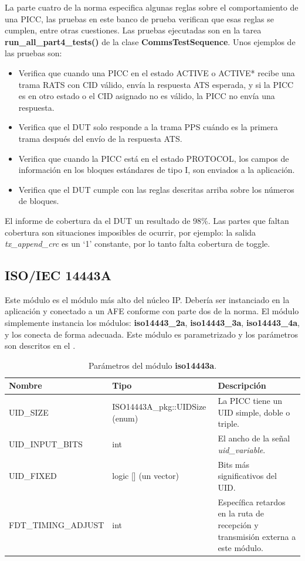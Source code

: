 \documentclass[a4paper, twoside, 11pt]{report}
\begin{document}
La parte cuatro de la norma especifica algunas reglas sobre el comportamiento de una PICC, las pruebas en este banco de prueba verifican que esas reglas se cumplen, entre otras cuestiones. Las pruebas ejecutadas son en la tarea \textbf{run\_all\_part4\_tests()} de la clase \textbf{CommsTestSequence}. Unos ejemplos de las pruebas son:

\begin{itemize}
  \item Verifica que cuando una PICC en el estado ACTIVE o ACTIVE* recibe una trama RATS con CID válido, envía la respuesta ATS esperada, y si la PICC es en otro estado o el CID asignado no es válido, la PICC no envía una respuesta.
  \item Verifica que el DUT solo responde a la trama PPS cuándo es la primera trama después del envío de la respuesta ATS.
  \item Verifica que cuando la PICC está en el estado PROTOCOL, los campos de información en los bloques estándares de tipo I, son enviados a la aplicación.
  \item Verifica que el DUT cumple con las reglas descritas arriba sobre los números de bloques.
\end{itemize}

El informe de cobertura da el DUT un resultado de 98\%. Las partes que faltan cobertura son situaciones imposibles de ocurrir, por ejemplo: la salida \textit{tx\_append\_crc} es un ‘1’ constante, por lo tanto falta cobertura de toggle.

\FloatBarrier
\subsection{ISO/IEC 14443A}

Este módulo es el módulo más alto del núcleo IP. Debería ser instanciado en la aplicación y conectado a un AFE conforme con parte dos de la norma. El módulo simplemente instancia los módulos: \textbf{iso14443\_2a}, \textbf{iso14443\_3a}, \textbf{iso14443\_4a}, y los conecta de forma adecuada. Este módulo es parametrizado y los parámetros son descritos en el .

\begin{table}[htb]
  \centering
  \tablezebra
  \begin{tabulary}{\linewidth}{l|l|L}
    \textbf{Nombre}&\textbf{Tipo}&\textbf{Descripción} \\
    \hline
    UID\_SIZE&ISO14443A\_pkg::UIDSize (enum)&La PICC tiene un UID simple, doble o triple. \\
    UID\_INPUT\_BITS&int&El ancho de la señal \textit{uid\_variable}. \\
    UID\_FIXED&logic [] (un vector)&Bits más significativos del UID. \\
    FDT\_TIMING\_ADJUST&int&Específica retardos en la ruta de recepción y transmisión externa a este módulo. \\
  \end{tabulary}
  \caption{Parámetros del módulo \textbf{iso14443a}.}
  \label{tab:params_iso14443a}
\end{table}
\end{document}
